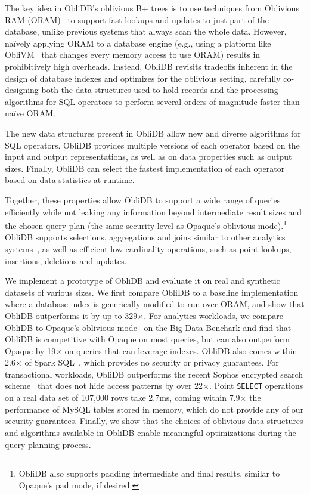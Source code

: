 \documentclass[letterpaper,twocolumn,10pt]{article}
\def\name/{ObliDB}
\begin{document}
The key idea in \name/'s oblivious B+ trees is to use techniques from Oblivious RAM (ORAM)~\cite{SDS+13} to support fast lookups and updates to just part of the database, unlike previous systems that always scan the whole data.
However, na\"ively applying ORAM to a database engine (e.g., using a platform like ObliVM~\cite{oblivm} that changes every memory access to use ORAM) results in prohibitively high overheads.
Instead, \name/ revisits tradeoffs inherent in the design of database indexes and optimizes for the oblivious setting, carefully co-designing both the data structures used to hold records and the processing algorithms for SQL operators to perform several orders of magnitude faster than na\"ive ORAM.

The new data structures present in \name/ allow new and diverse algorithms for SQL operators. \name/ provides multiple versions of each operator based on the input and output representations, as well as on data properties such as output sizes.
Finally, \name/ can select the fastest implementation of each operator based on data statistics at runtime.

Together, these properties allow \name/ to support a wide range of queries efficiently while not leaking any information beyond intermediate result sizes and the chosen query plan (the same security level as Opaque's oblivious mode).\footnote{
    \name/ also supports padding intermediate and final results, similar to Opaque's pad mode, if desired.
}
\name/ supports selections, aggregations and joins similar to other analytics systems~\cite{ZDB+17,cipherbase}, as well as efficient low-cardinality operations, such as point lookups, insertions, deletions and updates.

We implement a prototype of \name/ and evaluate it on real and synthetic datasets of various sizes.
We first compare \name/ to a baseline implementation where a database index is generically modified to run over ORAM, and show that \name/ outperforms it by up to 329$\times$.
For analytics workloads, we compare \name/ to Opaque's oblivious mode~\cite{ZDB+17} on the Big Data Benchark\cite{BDB} and find that \name/ is competitive with Opaque on most queries, but can also outperform Opaque by 19$\times$ on queries that can leverage indexes.
\name/ also comes within 2.6$\times$ of Spark SQL~\cite{SparkSQL}, which provides no security or privacy guarantees.
For transactional workloads, \name/ outperforms the recent Sophos encrypted search scheme~\cite{Bost16} that does not hide access patterns by over 22$\times$. Point \texttt{SELECT} operations on a real data set of 107,000 rows take 2.7ms, coming within 7.9$\times$ the performance of MySQL tables stored in memory, which do not provide any of our security guarantees.
Finally, we show that the choices of oblivious data structures and algorithms available in \name/ enable meaningful optimizations during the query planning process.
\end{document}
